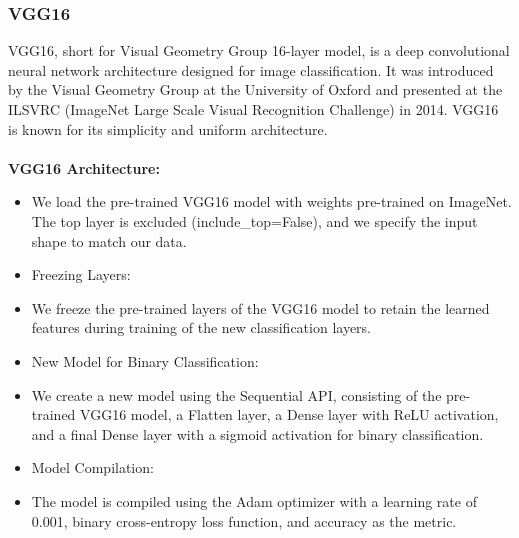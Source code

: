 \documentclass{article}
\begin{document}
\subsubsection{VGG16}
VGG16, short for Visual Geometry Group 16-layer model, is a deep convolutional neural network architecture designed for image classification. It was introduced by the Visual Geometry Group at the University of Oxford and presented at the ILSVRC (ImageNet Large Scale Visual Recognition Challenge) in 2014. VGG16 is known for its simplicity and uniform architecture.
\paragraph{}
\textbf{VGG16 Architecture:}
\begin{itemize}
    \item We load the pre-trained VGG16 model with weights pre-trained on ImageNet. The top layer is excluded (include\_top=False), and we specify the input shape to match our data.
    \item Freezing Layers:
    \item We freeze the pre-trained layers of the VGG16 model to retain the learned features during training of the new classification layers.
    \item New Model for Binary Classification:
    \item We create a new model using the Sequential API, consisting of the pre-trained VGG16 model, a Flatten layer, a Dense layer with ReLU activation, and a final Dense layer with a sigmoid activation for binary classification.
    \item Model Compilation:
    \item The model is compiled using the Adam optimizer with a learning rate of 0.001, binary cross-entropy loss function, and accuracy as the metric.
\end{itemize}
\end{document}

